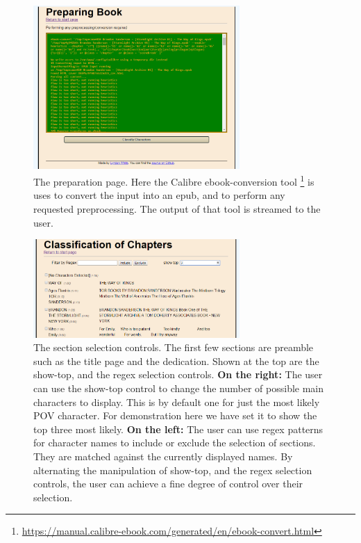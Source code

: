 \documentclass[11pt,a4paper]{article}
\begin{document}
\begin{figure}
	\centering
	\includegraphics[width=0.7\textwidth]{preprocessing}
	\caption{The preparation page.
		Here the Calibre ebook-conversion tool \footnote{\url{https://manual.calibre-ebook.com/generated/en/ebook-convert.html}} is uses to convert the input into an epub, and to perform any requested preprocessing.
		The output of that tool is streamed to the user.	
	}
	\label{fig:preprocess}
\end{figure}


\begin{figure}
	\centering
	\includegraphics[width=0.7\textwidth]{classstart}
	\caption{The section selection controls. 
		The first few sections are preamble such as the title page and the dedication.
		Shown at the top are the show-top, and the regex selection controls.
		\textbf{On the right:}
		The user can use the show-top control to change the number of possible main characters to display.
		This is by default one for just the most likely POV character.
		For demonstration here we have set it to show the top three most likely.
		\textbf{On the left:}
		The user can use regex patterns for character names to include or exclude the selection of sections.
		They are matched against the currently displayed names.
		By alternating the manipulation of show-top, and the regex selection controls,
		the user can achieve a fine degree of control over their selection.
	}
	\label{fig:classstart}
\end{figure}
\end{document}

